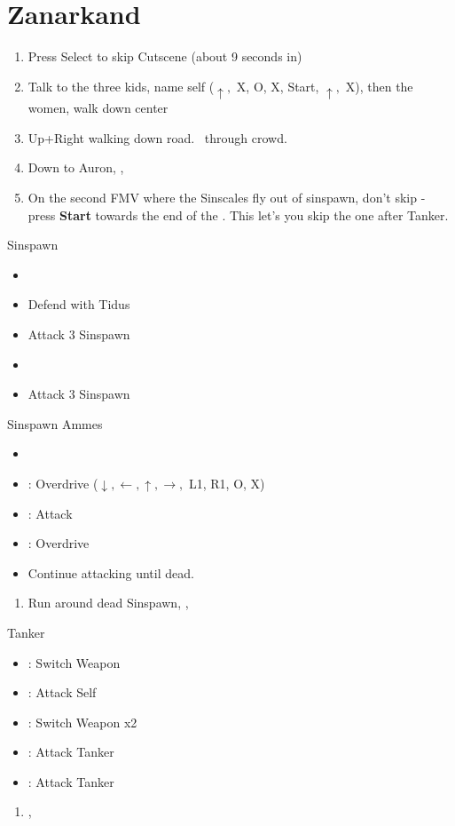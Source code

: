 \chapter{Zanarkand}\label{ch:zanarkand}

\begin{enumerate}
	\item Press Select to skip Cutscene (about 9 seconds in)
	\item Talk to the three kids, name self ($\uparrow,$ X, O, X, Start, $\uparrow,$ X), then the women, walk down center
	\item Up+Right walking down road. \sd \ through crowd. \skippablefmv
	\item Down to Auron, \sd, \skippablefmv
	\item On the second FMV where the Sinscales fly out of sinspawn, don't skip - press \textbf{Start} towards the end of the \fmv. This let's you skip the one after Tanker. \sd
\end{enumerate}
\begin{battle}{Sinspawn}
	\begin{itemize}
		\item \sd
		\item Defend with Tidus
		\item Attack 3 Sinspawn
		\item \sd
		\item Attack 3 Sinspawn
	\end{itemize}
\end{battle}
\begin{battle}[2400]{Sinspawn Ammes}
	\begin{itemize}
		\item \sd
		\item \auron: Overdrive ($\downarrow, \leftarrow, \uparrow, \rightarrow,$ L1, R1, O, X)
		\item \tidus: Attack
		\item \tidus: Overdrive
		\item Continue attacking until dead.
	\end{itemize}
\end{battle}
\begin{enumerate}[resume]
	\item Run around dead Sinspawn, \save, \sd
\end{enumerate}
\begin{battle}[1000]{Tanker}
	\begin{itemize}
		\item \tidus: Switch Weapon
		\item \auron: Attack Self
		\item \tidus: Switch Weapon x2
		\item \tidus: Attack Tanker
		\item \auron: Attack Tanker
	\end{itemize}
\end{battle}
\begin{enumerate}[resume]
	\item \cs[2:00], \skippablefmv
\end{enumerate}